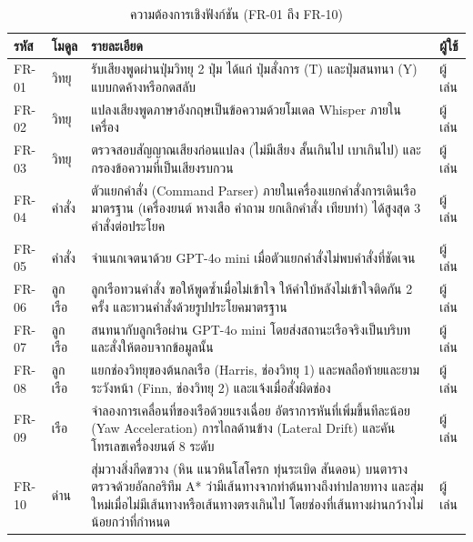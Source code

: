 \begin{table}[!htbp]
\centering
\caption{ความต้องการเชิงฟังก์ชัน (FR-01 ถึง FR-10)}
\label{tab:func_req}
\begin{tabular}{|L{1.18cm}|L{1.76cm}|L{8.33cm}|L{1.57cm}|}
\hline
\textbf{รหัส} & \textbf{โมดูล} & \textbf{รายละเอียด} & \textbf{ผู้ใช้} \\
\hline
FR-01 & วิทยุ & รับเสียงพูดผ่านปุ่มวิทยุ 2 ปุ่ม ได้แก่ ปุ่มสั่งการ (T) และปุ่มสนทนา (Y) แบบกดค้างหรือกดสลับ & ผู้เล่น \\ \hline
FR-02 & วิทยุ & แปลงเสียงพูดภาษาอังกฤษเป็นข้อความด้วยโมเดล Whisper ภายในเครื่อง & ผู้เล่น \\ \hline
FR-03 & วิทยุ & ตรวจสอบสัญญาณเสียงก่อนแปลง (ไม่มีเสียง สั้นเกินไป เบาเกินไป) และกรองข้อความที่เป็นเสียงรบกวน & ผู้เล่น \\ \hline
FR-04 & คำสั่ง & ตัวแยกคำสั่ง (Command Parser) ภายในเครื่องแยกคำสั่งการเดินเรือมาตรฐาน (เครื่องยนต์ หางเสือ คำถาม ยกเลิกคำสั่ง เทียบท่า) ได้สูงสุด 3 คำสั่งต่อประโยค & ผู้เล่น \\ \hline
FR-05 & คำสั่ง & จำแนกเจตนาด้วย GPT-4o mini เมื่อตัวแยกคำสั่งไม่พบคำสั่งที่ชัดเจน & ผู้เล่น \\ \hline
FR-06 & ลูกเรือ & ลูกเรือทวนคำสั่ง ขอให้พูดซ้ำเมื่อไม่เข้าใจ ให้คำใบ้หลังไม่เข้าใจติดกัน 2 ครั้ง และทวนคำสั่งด้วยรูปประโยคมาตรฐาน & ผู้เล่น \\ \hline
FR-07 & ลูกเรือ & สนทนากับลูกเรือผ่าน GPT-4o mini โดยส่งสถานะเรือจริงเป็นบริบทและสั่งให้ตอบจากข้อมูลนั้น & ผู้เล่น \\ \hline
FR-08 & ลูกเรือ & แยกช่องวิทยุของต้นกลเรือ (Harris, ช่องวิทยุ 1) และพลถือท้ายและยามระวังหน้า (Finn, ช่องวิทยุ 2) และแจ้งเมื่อสั่งผิดช่อง & ผู้เล่น \\ \hline
FR-09 & เรือ & จำลองการเคลื่อนที่ของเรือด้วยแรงเฉื่อย อัตราการหันที่เพิ่มขึ้นทีละน้อย (Yaw Acceleration) การไถลด้านข้าง (Lateral Drift) และคันโทรเลขเครื่องยนต์ 8 ระดับ & ผู้เล่น \\ \hline
FR-10 & ด่าน & สุ่มวางสิ่งกีดขวาง (หิน แนวหินโสโครก ทุ่นระเบิด สันดอน) บนตาราง ตรวจด้วยอัลกอริทึม A* ว่ามีเส้นทางจากท่าต้นทางถึงท่าปลายทาง และสุ่มใหม่เมื่อไม่มีเส้นทางหรือเส้นทางตรงเกินไป โดยช่องที่เส้นทางผ่านกว้างไม่น้อยกว่าที่กำหนด & ผู้เล่น \\
\hline
\end{tabular}
\end{table}


